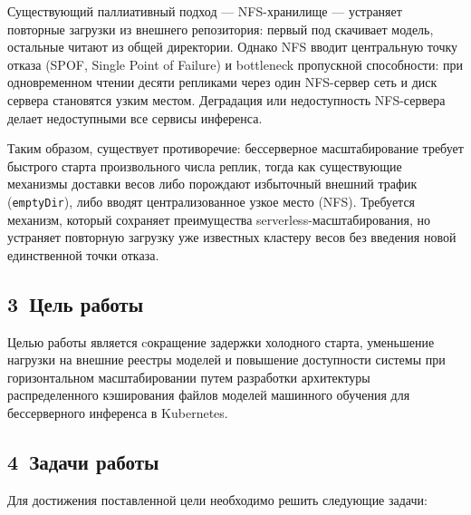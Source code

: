 Существующий паллиативный подход --- NFS-хранилище --- устраняет повторные загрузки из внешнего репозитория: первый под скачивает модель, остальные читают из общей директории. Однако NFS вводит центральную точку отказа (SPOF, Single Point of Failure) и bottleneck пропускной способности: при одновременном чтении десяти репликами через один NFS-сервер сеть и диск сервера становятся узким местом. Деградация или недоступность NFS-сервера делает недоступными все сервисы инференса.

Таким образом, существует противоречие: бессерверное масштабирование требует быстрого старта произвольного числа реплик, тогда как существующие механизмы доставки весов либо порождают избыточный внешний трафик (\texttt{emptyDir}), либо вводят централизованное узкое место (NFS). Требуется механизм, который сохраняет преимущества serverless-масштабирования, но устраняет повторную загрузку уже известных кластеру весов без введения новой единственной точки отказа.

\subsection*{3~Цель работы}

Целью работы является cокращение задержки холодного старта, уменьшение нагрузки на внешние реестры моделей и повышение доступности системы при горизонтальном масштабировании путем разработки архитектуры распределенного кэширования файлов моделей машинного обучения для бессерверного инференса в Kubernetes.

\subsection*{4~Задачи работы}

Для достижения поставленной цели необходимо решить следующие задачи:


